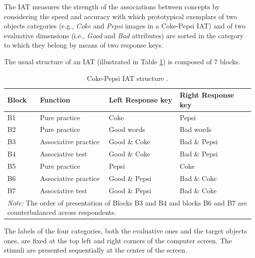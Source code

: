 \documentclass[12pt]{book}
\begin{document}
The IAT measures the strength of the associations between concepts by considering the speed and accuracy with which prototypical exemplars of two objects  categories (e.g., \emph{Coke} and \emph{Pepsi} images in a Coke-Pepsi IAT) and of two evaluative dimensions (i.e., \emph{Good} and \emph{Bad} attributes) are sorted in the category to which they belong by means of two response keys. 

The usual structure of an IAT (illustrated in Table \ref{tab:iatstructure}) is composed of 7 blocks.
\begin{table}[h!]
	\centering \doublespacing
	\caption{Coke-Pepsi IAT structure \protect\cite<adapted from >{Greenwald2003}.}
	\label{tab:iatstructure}
	\begin{tabular}{p{1cm}  p{4cm} p{4cm} p{4cm}}
		\toprule
		Block  & Function  & Left Response key & Right Response key \\
		\midrule
		B1  & Pure practice & Coke & Pepsi \\
		B2  & Pure practice 	& Good words & Bad words \\
		B3  & Associative practice & Good \& Coke & Bad \& Pepsi \\
		B4 & Associative test & Good \& Coke & Bad \& Pepsi \\
		B5 & Pure practice & Pepsi & Coke \\
		B6 & Associative practice & Good \& Pepsi & Bad \& Coke \\
		B7 & Associative test & Good \& Pepsi & Bad \& Coke \\
		\bottomrule
		\multicolumn{4}{p{14cm}}{\onehalfspacing\emph{Note:} The order of presentation of Blocks B3 and B4 and blocks B6 and B7 are counterbalanced across respondents.}
	\end{tabular}
\end{table}
The labels of the four categories, both the evaluative ones and the target objects ones, are fixed at the top left and right corners of the computer screen. 
The stimuli are presented sequentially at the center of the screen. 
\end{document}
